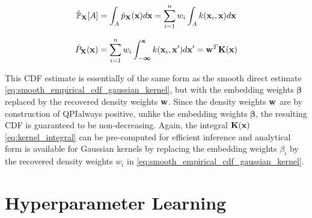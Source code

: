 \documentclass[twoside]{article} \usepackage{aistats2017}
\theoremstyle{definition}
\theoremstyle{theorem}
\newcommand{\rv}[1]{{#1}}
\newcommand{\qpi}{QPI}
\begin{document}
	\begin{equation}
		\hat{\mathbb{P}}_{\bvec{\rv{X}}}[A] = \int_{A} \hat{p}_{\bvec{\rv{X}}}(\bvec{x}) d\bvec{x} = \sum_{i = 1}^{n} w_{i} \int_{A} k(\bvec{x}_{i}, \bvec{x}) d\bvec{x}
	\label{eq:qpi_empirical_distribution}
	\end{equation}
	
	\begin{equation}
		\hat{P}_{\bvec{\rv{X}}}(\bvec{x}) = \sum_{i = 1}^{n} w_{i} \int_{-\bm{\infty}}^{\bvec{x}} k(\bvec{x}_{i}, \bvec{x}') d\bvec{x}' =  \bvec{w}^{T} \bvec{K}(\bvec{x})
	\label{eq:qpi_empirical_cdf}
	\end{equation}
	
	
	
	This CDF estimate is essentially of the same form as the smooth direct estimate \eqref{eq:smooth_empirical_cdf_gaussian_kernel}, but with the embedding weights $\bm{\beta}$ replaced by the recovered density weights $\mathbf{w}$. Since the density weights $\mathbf{w}$ are by construction of \qpi\space always positive, unlike the embedding weights $\bm{\beta}$, the resulting CDF is guaranteed to be non-decreasing. Again, the integral $\mathbf{K}(\mathbf{x})$ \eqref{eq:kernel_integral} can be pre-computed for efficient inference and analytical form is available for Gaussian kernels by replacing the embedding weights $\beta_{i}$ by the recovered density weights $w_{i}$ in \eqref{eq:smooth_empirical_cdf_gaussian_kernel}.
 
\section{Hyperparameter Learning}
\label{sec:hyperparameter_learning}
\end{document}
